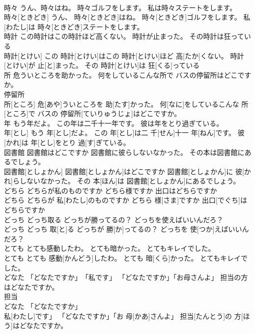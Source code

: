 \documentclass[8pt]{extreport}
\begin{document}
\begin{CJK}{UTF8}{min}
\\	時々 うん、時々はね。 時々ゴルフをします。 私は時々ステートをします。	
\\	時々[ときどき] うん、 時々[ときどき]はね。 時々[ときどき]ゴルフをします。 私[わたし]は 時々[ときどき]ステートをします。
\\	時計 この時計はこの時計ほど高くない。 時計が止まった。 その時計は狂っている	
\\	時計[とけい] この 時計[とけい]はこの 時計[とけい]ほど 高[たか]くない。 時計[とけい]が 止[と]まった。 その 時計[とけい]は 狂[くる]っている
\\	所 危ういところを助かった。 何をしているこんな所で バスの停留所はどこですか。	
\\	停留所 
\\	所[ところ] 危[あや]ういところを 助[たす]かった。 何[なに]をしているこんな 所[ところ]で バスの 停留所[ていりゅうじょ]はどこですか。
\\	年 もう年だよ。 この年は二千十一年です。 彼は年をとり過ぎている。	
\\	年[とし] もう 年[とし]だよ。 この 年[とし]は二 千[せん]十一 年[ねん]です。 彼[かれ]は 年[とし]をとり 過[す]ぎている。
\\	図書館 図書館はどこですか 図書館に彼らしないなかった。 その本は図書館にあるでしょう。	
\\	図書館[としょかん] 図書館[としょかん]はどこですか 図書館[としょかん]に 彼[かれ]らしないなかった。 その 本[ほん]は 図書館[としょかん]にあるでしょう。
\\	どちら どちらが私のものですか どちら様ですか 出口はどちらですか	
\\	どちら どちらが 私[わたし]のものですか どちら 様[さま]ですか 出口[でぐち]はどちらですか
\\	どっち どっち取る どっちが勝ってるの？ どっちを使えばいいんだろ？	
\\	どっち どっち 取[と]る どっちが 勝[か]ってるの？ どっちを 使[つか]えばいいんだろ？
\\	とても とても感動したわ。 とても暗かった。 とてもキレイでした。	
\\	とても とても 感動[かんどう]したわ。 とても 暗[くら]かった。 とてもキレイでした。
\\	どなた 「どなたですか」　「私です」 「どなたですか」「お母さんよ」 担当の方はどなたですか。	
\\	担当
\\	どなた 「どなたですか」 
\\	私[わたし]です」 「どなたですか」「お 母[かあ]さんよ」 担当[たんとう]の 方[ほう]はどなたですか。

\end{CJK}
\end{document}
